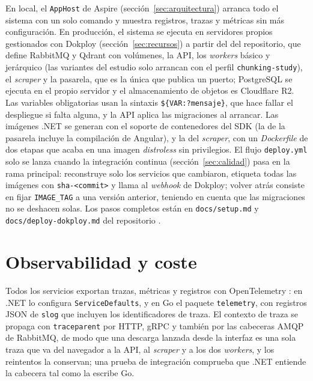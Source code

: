 En local, el \texttt{AppHost} de Aspire \cite{aspire} (sección~\ref{sec:arquitectura}) arranca todo el sistema con un solo comando y muestra registros, trazas y métricas sin más configuración. En producción, el sistema se ejecuta en servidores propios gestionados con Dokploy \cite{dokploy} (sección~\ref{sec:recursos}) a partir del  del repositorio, que define RabbitMQ y Qdrant con volúmenes, la API, los \emph{workers} básico y jerárquico (las variantes del estudio solo arrancan con el perfil \texttt{chunking-study}), el \emph{scraper} y la pasarela, que es la única que publica un puerto; PostgreSQL se ejecuta en el propio servidor y el almacenamiento de objetos es Cloudflare R2. Las variables obligatorias usan la sintaxis \texttt{\$\{VAR:?mensaje\}}, que hace fallar el despliegue si falta alguna, y la API aplica las migraciones al arrancar.
Las imágenes .NET se generan con el soporte de contenedores del SDK (la de la pasarela incluye la compilación de Angular), y la del \emph{scraper}, con un \emph{Dockerfile} de dos etapas que acaba en una imagen \emph{distroless} sin privilegios. El flujo \texttt{deploy.yml} solo se lanza cuando la integración continua (sección~\ref{sec:calidad}) pasa en la rama principal: reconstruye solo los servicios que cambiaron, etiqueta todas las imágenes con \texttt{sha-<commit>} y llama al \emph{webhook} de Dokploy; volver atrás consiste en fijar \texttt{IMAGE\_TAG} a una versión anterior, teniendo en cuenta que las migraciones no se deshacen solas. Los pasos completos están en \texttt{docs/setup.md} y \texttt{docs/deploy-dokploy.md} del repositorio \cite{repositorio}.

\section{Observabilidad y coste}
\label{sec:impl-observabilidad-detalle}

Todos los servicios exportan trazas, métricas y registros con OpenTelemetry \cite{opentelemetry}: en .NET lo configura \texttt{ServiceDefaults}, y en Go el paquete \texttt{telemetry}, con registros JSON de \texttt{slog} que incluyen los identificadores de traza. El contexto de traza se propaga con \texttt{traceparent} por HTTP, gRPC y también por las cabeceras AMQP de RabbitMQ, de modo que una descarga lanzada desde la interfaz es una sola traza que va del navegador a la API, al \emph{scraper} y a los dos \emph{workers}, y los reintentos la conservan; una prueba de integración comprueba que .NET entiende la cabecera tal como la escribe Go.

